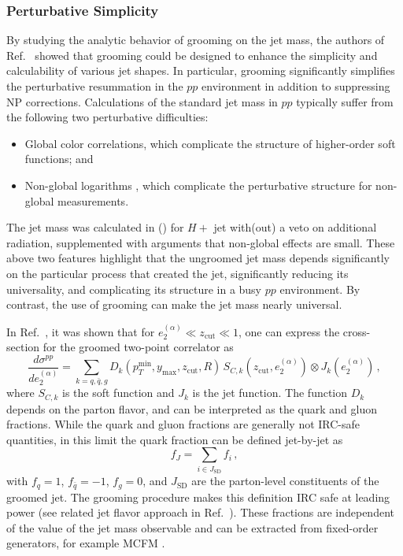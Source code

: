 \documentclass[11pt]{cernrep}
\begin{document}
\subsubsection{Perturbative Simplicity}
\label{jetsub_alphas_sec:pertsimplicity}

By studying the analytic behavior of grooming on the jet mass, the authors of Ref.~\cite{Dasgupta:2013ihk} showed that grooming could be designed to enhance the simplicity and calculability of various jet shapes.
%
In particular, grooming significantly simplifies the perturbative resummation in the $pp$ environment in addition to suppressing NP corrections.
%
Calculations of the standard jet mass in $pp$ typically suffer from the following two perturbative difficulties:
%
\begin{itemize}
%
\item Global color correlations, which complicate the structure of higher-order soft functions; and
%
\item Non-global logarithms \cite{Dasgupta:2001sh}, which complicate the perturbative structure for non-global measurements.
%
\end{itemize}
%
The jet mass was calculated in \cite{Jouttenus:2013hs} (\cite{arXiv:1207.1640}) for $H+$ jet with(out) a veto on additional radiation, supplemented with arguments that non-global effects are small.
%
These above two features highlight that the ungroomed jet mass depends significantly on the particular process that created the jet, significantly reducing its universality, and complicating its structure in a busy $pp$ environment.
%
By contrast, the use of grooming can make the jet mass nearly universal.

In Ref.~\cite{Frye:2016aiz}, it was shown that for $e_2^{(\alpha)}\ll z_{\mathrm{cut}}  \ll 1$, one can express the cross-section for the groomed two-point correlator as
%
\begin{equation}
\label{jetsub_alphas_eq:fac_pp_e2}
\frac{d\sigma^{pp}}{de_2^{(\alpha)}}=\sum\limits_{k=q,\bar q, g}D_k(p_T^{\mathrm{min}}, y_\mathrm{max}, z_{\mathrm{cut}} , R) \, S_{C,k}(z_{\mathrm{cut}} , e_2^{(\alpha)})\otimes J_k (e_2^{(\alpha)})\,,
\end{equation}
%
where $S_{C,k}$ is the soft function and $J_k$ is the jet function.
%
The function $D_k$ depends on the parton flavor, and can be interpreted as the quark and gluon fractions.
%
While the quark and gluon fractions are generally not IRC-safe quantities, in this limit the quark fraction can be defined jet-by-jet as 
\begin{equation}
f_J=\sum\limits_{i\in J_{\mathrm{SD}}} f_i\,,
\end{equation}
with $f_q=1$, $f_{\bar q}=-1$, $f_g=0$, and $J_{\mathrm{SD}}$ are the parton-level constituents of the groomed jet.
%
The grooming procedure makes this definition IRC safe at leading power (see related jet flavor approach in Ref.~\cite{Banfi:2006hf}).
%
These fractions are independent of the value of the jet mass observable and can be extracted from fixed-order generators, for example MCFM \cite{Campbell:1999ah,Campbell:2010ff,Campbell:2011bn}.
\end{document}
